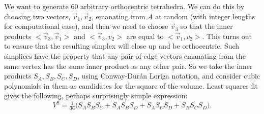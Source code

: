 \documentclass[10.5pt]
{amsart}
\begin{document}
\vspace{-5pt}
\begin{figure}
  \centering
\end{figure}


We want to generate 60 arbitrary orthocentric tetrahedra. We can do this by choosing two vectors, $\vec v_1 , \vec v_2$,  emanating from $A$ at random (with integer lengths for computational ease), and then we need to choose $\vec v_3$ so that the inner products $< \vec v_3, \vec v_1>$ and $< \vec v_3, v_2>$ are equal to $< \vec v_1, v_2>$. This turns out to ensure that the resulting simplex will close up and be orthocentric. Such simplices have the property that any pair of edge vectors emanating from the same vertex has the same inner product as any other pair. So we take the inner products $S_A,S_B,S_C,S_D$, using Conway-Dur\'an Loriga notation, and consider cubic polynomials in them as candidates for the square of the volume. Least squares fit gives the following, perhaps surprisingly simple expression:
\[  
V^2=\tfrac1{36}\bigl(S_AS_BS_C+S_AS_BS_D+S_AS_CS_D+S_BS_CS_D\bigr)
.
\]
\end{document}
